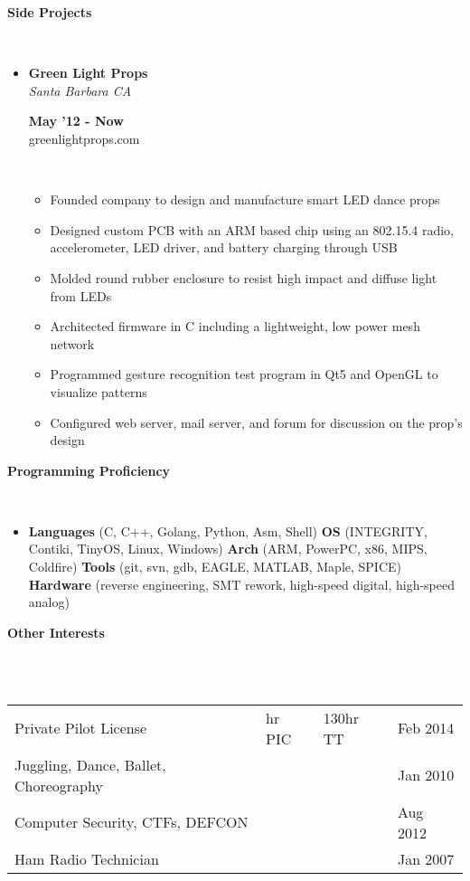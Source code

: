\documentclass[a4paper,11pt]{article}
\newcommand{\lsep}{-0.2cm}
\newcommand{\resheading}[1]{{\small \colorbox{mygrey}{\begin{minipage}{0.975\textwidth}{\textbf{#1 \vphantom{p\^{E}}}}\end{minipage}}}}
\newcommand{\workexp}[4]{
\begin{minipage}[t]{7cm}
\begin{flushleft}
\textbf{#1} \\
\indent \emph{#2}\\
\end{flushleft}
\end{minipage}
\hfill
\begin{minipage}[t]{7cm}
\begin{flushright}
\textbf{#3} \\
\indent #4 \\
\end{flushright}
\end{minipage}
}
\begin{document}

\resheading{\textbf{Side Projects}}\\[\lsep]

\begin{itemize}
\item \workexp{Green Light Props}{Santa Barbara CA}{May '12 - Now}{greenlightprops.com}
\\[-0.2cm]
	\begin{itemize}
	\item Founded company to design and manufacture smart LED dance props
	\item Designed custom PCB with an ARM based chip using an 802.15.4 radio, accelerometer, LED driver, and battery charging through USB
	\item Molded round rubber enclosure to resist high impact and diffuse light from LEDs
	\item Architected firmware in C including a lightweight, low power mesh network
	\item Programmed gesture recognition test program in Qt5 and OpenGL to visualize patterns
	\item Configured web server, mail server, and forum for discussion on the prop's design
	\end{itemize}
\end{itemize}



\resheading{\textbf{Programming Proficiency} }\\[\lsep]
\begin{itemize}
\item \noindent \textbf{Languages} (C, C++, Golang, Python, Asm, Shell)  
\textbf{OS} (INTEGRITY, Contiki, TinyOS, Linux, Windows) 
\textbf{Arch} (ARM, PowerPC, x86, MIPS, Coldfire) 
\textbf{Tools} (git, svn, gdb, EAGLE, MATLAB, Maple, SPICE) 
\textbf{Hardware} (reverse engineering, SMT rework, high-speed digital, high-speed analog)
\end{itemize} 



\resheading{\textbf{Other Interests} }\\[\lsep]
\\[0.2cm]
\indent \begin{tabular}{   l  l  l  l } 
\indent Private Pilot License & \indent 40 hr PIC & \indent 130hr TT  \indent & \indent Feb 2014\\
\indent Juggling, Dance, Ballet, Choreography \indent \indent \indent & \indent    & \indent  & \indent Jan 2010 \\
\indent Computer Security, CTFs, DEFCON & \indent  & \indent  & \indent Aug 2012\\
\indent Ham Radio Technician & \indent  & \indent  & \indent Jan 2007\\
\end{tabular}



\end{document}
